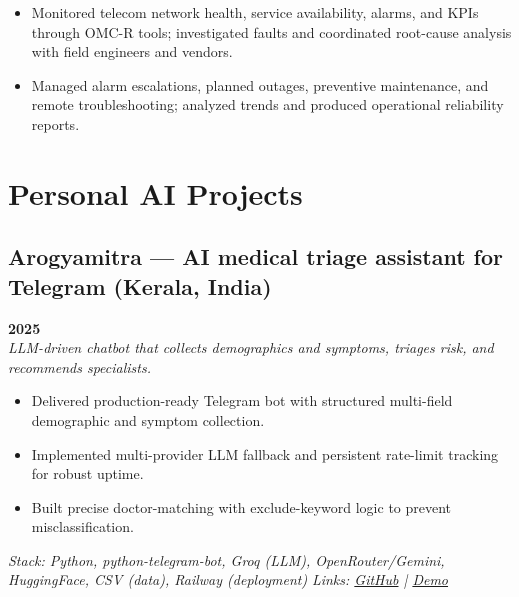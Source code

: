 \documentclass[a4paper,10pt]{article}
\begin{document}
\begin{itemize}
\item Monitored telecom network health, service availability, alarms, and KPIs through OMC-R tools; investigated faults and coordinated root-cause analysis with field engineers and vendors.

\item Managed alarm escalations, planned outages, preventive maintenance, and remote troubleshooting; analyzed trends and produced operational reliability reports.
\end{itemize}

\section{Personal AI Projects}
\subsection{Arogyamitra — AI medical triage assistant for Telegram (Kerala, India)} \hfill \textbf{2025} \\
\textit{LLM-driven chatbot that collects demographics and symptoms, triages risk, and recommends specialists.}
\begin{itemize}
	\item Delivered production-ready Telegram bot with structured multi-field demographic and symptom collection.
	\item Implemented multi-provider LLM fallback and persistent rate-limit tracking for robust uptime.
	\item Built precise doctor-matching with exclude-keyword logic to prevent misclassification.
\end{itemize}
\textit{Stack: Python, python-telegram-bot, Groq (LLM), OpenRouter/Gemini, HuggingFace, CSV (data), Railway (deployment)}
\textit{Links: \href{https://github.com/rasheedhaq/arogy_bot}{GitHub} \;|\; \href{https://t.me/arogyamitr_bot}{Demo}}
\end{document}
